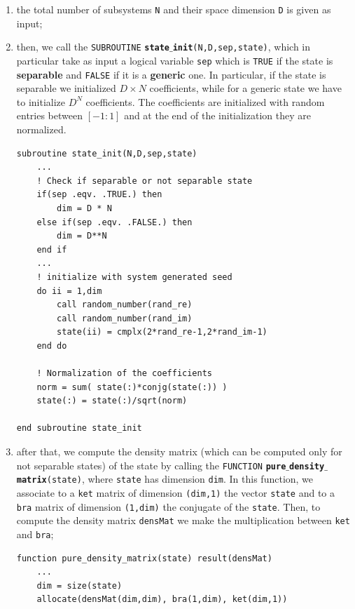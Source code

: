 \documentclass[rmp,10pt,onecolumn,fleqn,notitlepage]{revtex4-1}
\begin{document}
\begin{enumerate}

\item the total number of subsystems \texttt{N} and their space dimension \texttt{D} is given as input;

\item then, we call the \texttt{SUBROUTINE} {\bfseries\texttt{state$\_$init}}\texttt{(N,D,sep,state)}, which in particular take as input a logical variable \texttt{sep} which is \texttt{TRUE} if the state is \textbf{separable} and \texttt{FALSE} if it is a \textbf{generic} one. In particular, if the state is separable we initialized \( D \times N \) coefficients, while for a generic state we have to initialize \( D^{N} \) coefficients. The coefficients are initialized with random entries between \( [-1:1] \) and at the end of the initialization they are normalized.

\begin{minipage}[t]{0.55\linewidth}%
\begin{lstlisting}[style=Fortran]
subroutine state_init(N,D,sep,state)
    ...
    ! Check if separable or not separable state
    if(sep .eqv. .TRUE.) then
        dim = D * N
    else if(sep .eqv. .FALSE.) then
        dim = D**N
    end if
    ...
    ! initialize with system generated seed
    do ii = 1,dim
        call random_number(rand_re)
        call random_number(rand_im)
        state(ii) = cmplx(2*rand_re-1,2*rand_im-1)
    end do

    ! Normalization of the coefficients
    norm = sum( state(:)*conjg(state(:)) )
    state(:) = state(:)/sqrt(norm)

end subroutine state_init\end{lstlisting}
\end{minipage}

\item after that, we compute the density matrix (which can be computed only for not separable states) of the state by calling the \texttt{FUNCTION} {\bfseries\texttt{pure$\_$density$\_$matrix}}\texttt{(state)}, where \texttt{state} has dimension \texttt{dim}.
In this function, we associate to a \texttt{ket} matrix of dimension \texttt{(dim,1)} the vector \texttt{state} and to a \texttt{bra} matrix of dimension \texttt{(1,dim)} the conjugate of the \texttt{state}. Then, to compute the density matrix \texttt{densMat} we make the multiplication between \texttt{ket} and \texttt{bra};

\begin{minipage}[t]{0.55\linewidth}%
\begin{lstlisting}[style=Fortran]
function pure_density_matrix(state) result(densMat)
    ...
    dim = size(state)
    allocate(densMat(dim,dim), bra(1,dim), ket(dim,1))


\end{lstlisting}
\end{minipage}
\end{enumerate}
\end{document}
